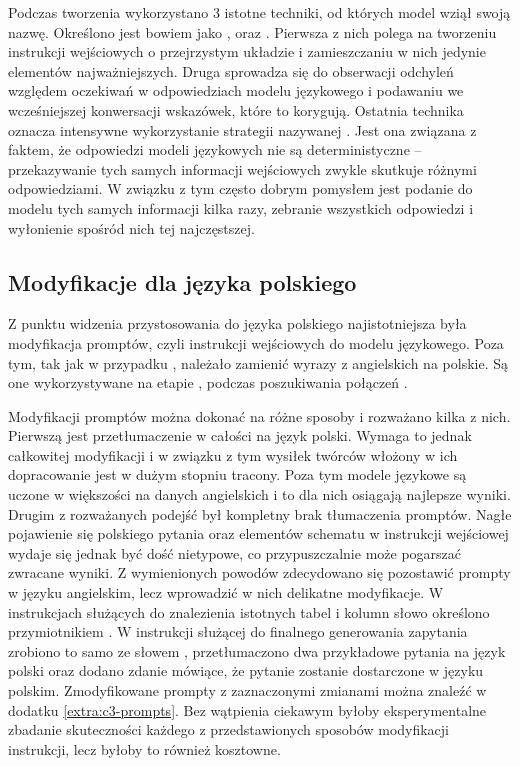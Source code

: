 Podczas tworzenia  wykorzystano 3 istotne techniki, od których model wziął swoją nazwę. Określono jest bowiem jako ,  oraz . Pierwsza z nich polega na tworzeniu instrukcji wejściowych o przejrzystym układzie i zamieszczaniu w nich jedynie elementów najważniejszych. Druga sprowadza się do obserwacji odchyleń względem oczekiwań w odpowiedziach modelu językowego i podawaniu we wcześniejszej konwersacji wskazówek, które to korygują. Ostatnia technika oznacza intensywne wykorzystanie strategii nazywanej  . Jest ona związana z faktem, że odpowiedzi modeli językowych nie są deterministyczne -- przekazywanie tych samych informacji wejściowych zwykle skutkuje różnymi odpowiedziami. W związku z tym często dobrym pomysłem jest podanie do modelu tych samych informacji kilka razy, zebranie wszystkich odpowiedzi i wyłonienie spośród nich tej najczęstszej.

\subsection{Modyfikacje dla języka polskiego}
Z punktu widzenia przystosowania  do języka polskiego najistotniejsza była modyfikacja promptów, czyli instrukcji wejściowych do modelu językowego. Poza tym, tak jak w przypadku , należało zamienić wyrazy  z angielskich na polskie. Są one wykorzystywane na etapie , podczas poszukiwania połączeń .

Modyfikacji promptów można dokonać na różne sposoby i rozważano kilka z nich. Pierwszą jest przetłumaczenie w całości na język polski. Wymaga to jednak całkowitej modyfikacji i w związku z tym wysiłek twórców  włożony w ich dopracowanie jest w dużym stopniu tracony. Poza tym modele językowe są uczone w większości na danych angielskich i to dla nich osiągają najlepsze wyniki. Drugim z rozważanych podejść był kompletny brak tłumaczenia promptów. Nagłe pojawienie się polskiego pytania oraz elementów schematu w instrukcji wejściowej wydaje się jednak być dość nietypowe, co przypuszczalnie może pogarszać zwracane wyniki. Z wymienionych powodów zdecydowano się pozostawić prompty w języku angielskim, lecz wprowadzić w nich delikatne modyfikacje. W instrukcjach służących do znalezienia istotnych tabel i kolumn słowo  określono przymiotnikiem . W instrukcji służącej do finalnego generowania zapytania zrobiono to samo ze słowem , przetłumaczono dwa przykładowe pytania na język polski oraz dodano zdanie mówiące, że pytanie zostanie dostarczone w języku polskim. Zmodyfikowane prompty z zaznaczonymi zmianami można znaleźć w dodatku \ref{extra:c3-prompts}. Bez wątpienia ciekawym byłoby eksperymentalne zbadanie skuteczności każdego z przedstawionych sposobów modyfikacji instrukcji, lecz byłoby to również kosztowne.

